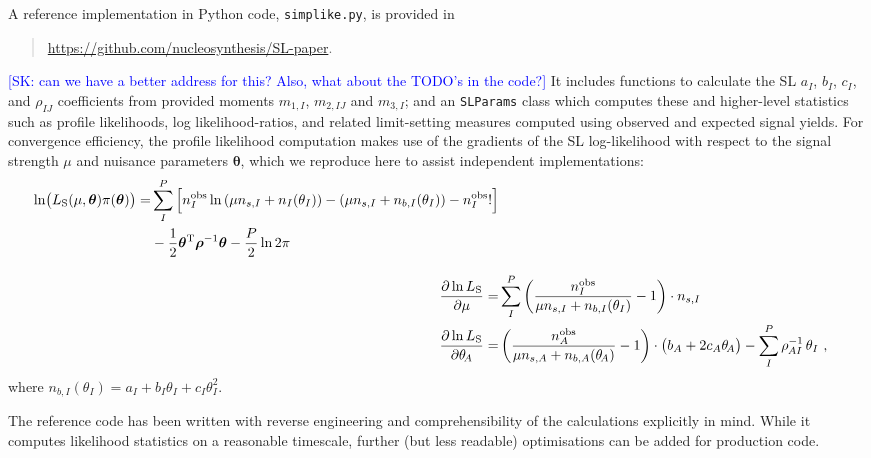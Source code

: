 \documentclass[11pt]{article}
\begin{document}
A reference implementation in Python code, {\tt simplike.py}, is provided in
\begin{quote}
  \url{https://github.com/nucleosynthesis/SL-paper}. 
\end{quote}
\textcolor{blue}{[SK: can we have a better address for this? Also, what about the TODO's in the code?]}
It includes functions to
calculate the SL $a_I$, $b_I$, $c_I$, and $\rho_{IJ}$ coefficients from provided
moments $m_{1,I}$, $m_{2,IJ}$ and $m_{3,I}$; and an \texttt{SLParams} class
which computes these and higher-level statistics such as profile likelihoods,
log likelihood-ratios, and related limit-setting measures computed using
observed and expected signal yields. For convergence efficiency, the profile
likelihood computation makes use of the gradients of the SL log-likelihood with
respect to the signal strength $\mu$ and nuisance parameters $\bm{\theta}$,
which we reproduce here to assist independent implementations:
%
\begin{align}
  \begin{split}
    \ln\! \big( L_{\rm{S}}(\mu,\bm{\theta} )\pi(\bm{\theta}) \big) =&
    \sum_I^P \Big[ n^{\rm{obs}}_{I} \ln \left(\mu n_{s,I} + n_{I}(\theta_{I}) \right) - \left( \mu n_{s,I} + n_{b,I}(\theta_{I}) \right) - n^{\rm{obs}}_{I}! \Big]\\
    &- \frac{1}{2} \bm{\theta}^\mathrm{T} \bm{\rho}^{-1} \bm{\theta} - \frac{P}{2} \ln 2\pi
  \end{split}\\[2ex]
  \frac{\partial\ln L_{\rm{S}}}{\partial\mu} =& \sum_I^P \left( \frac{n^{\rm{obs}}_I}{\mu n_{s,I} + n_{b,I}(\theta_{I})} - 1 \right) \cdot n_{s,I} \\
  \frac{\partial\ln L_{\rm{S}}}{\partial\theta_{\!A}} =& \left( \frac{n^{\rm{obs}}_A}{\mu n_{s,A} + n_{b,A}(\theta_{\!A}) } - 1 \right) \cdot \big( b_A + 2 c_A \theta_{\!A} \big) - \sum_I^P \rho_{\mspace{-1mu}AI}^{-1} \, \theta_I ~,
\label{eq:SL_LHC_refcode}
\end{align}
%
where $n_{b,I}(\theta_{I}) = a_{I} + b_{I}\theta_{I} + c_{I}\theta_{I}^{2}$.

The reference code has been written with reverse engineering and
comprehensibility of the calculations explicitly in mind. While it computes
likelihood statistics on a reasonable timescale, further (but less readable)
optimisations can be added for production code.





\end{document}
